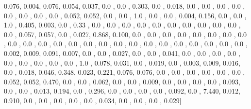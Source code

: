 \documentclass[usenames,dvipsnames]{article} %
\begin{document}
0.076, 0.004, 0.076, 0.054, 0.037, 0.0  , 0.0  , 0.303, 0.0  , 0.018, 0.0  , 0.0  , 0.0  , 0.0  , 0.0  , 0.0  , 0.0  , 0.0  , 0.052, 0.052, 0.0  , 0.0  , 1.0  , 0.0  , 0.0  , 0.004, 0.156, 0.0  , 0.0  , 1.0  , 0.405, 0.003, 0.0  , 0.33 , 0.0  , 0.0  , 0.0  , 0.0  , 0.0  , 0.0  , 0.0  , 0.0  , 0.0  , 0.0  , 0.0  , 0.057, 0.057, 0.0  , 0.027, 0.868, 0.100, 0.0  , 0.0  , 0.0  , 0.0  , 0.0  , 0.0  , 0.0  , 0.0  , 0.0  , 0.0  , 0.0  , 0.0  , 0.0  , 0.0  , 0.0  , 0.0  , 0.0  , 0.0  , 0.0  , 0.0  , 0.0  , 0.0  , 0.0  , 0.0  , 0.002, 0.009, 0.091, 0.007, 0.0  , 0.0  , 0.027, 0.0  , 0.0  , 0.041, 0.0  , 0.0  , 0.0  , 0.0  , 0.0  , 0.0  , 0.0  , 0.0  , 0.0  , 1.0  , 0.078, 0.031, 0.0  , 0.019, 0.0  , 0.003, 0.009, 0.016, 0.0  , 0.018, 0.046, 0.348, 0.023, 0.221, 0.076, 0.076, 0.0  , 0.0  , 0.0  , 0.0  , 0.0  , 0.0  , 0.052, 0.052, 0.470, 0.0  , 0.0  , 0.062, 0.0  , 0.0  , 0.009, 0.0  , 0.0  , 0.0  , 0.0  , 0.093, 0.0  , 0.0  , 0.013, 0.194, 0.0  , 0.296, 0.0  , 0.0  , 0.0  , 0.0  , 0.092, 0.0  , 7.440, 0.012, 0.910, 0.0  , 0.0  , 0.0  , 0.0  , 0.0  , 0.034, 0.0  , 0.0  , 0.0  , 0.029]
\end{document}
